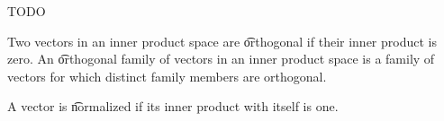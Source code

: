 

TODO



Two vectors in an inner product space are \t{orthogonal} if their inner product is zero.
An \t{orthogonal family of vectors} in an inner product space is a family of vectors for which distinct family members are orthogonal.

A vector is \t{normalized} if its inner product with itself is one.


